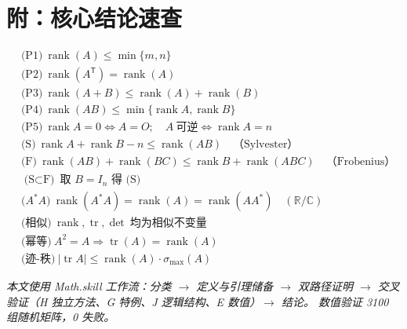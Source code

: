\documentclass[11pt]{ctexart}
\newcommand{\rank}{\operatorname{rank}}
\newcommand{\tr}{\operatorname{tr}}
\newcommand{\C}{\mathbb{C}}
\newcommand{\R}{\mathbb{R}}
\newcommand{\T}{^{\mathsf T}}
\begin{document}
\section*{附：核心结论速查}

\begin{keybox}
\begin{align*}
&\text{(P1)}\ \rank(A)\le\min\{m,n\}\\
&\text{(P2)}\ \rank(A\T)=\rank(A)\\
&\text{(P3)}\ \rank(A+B)\le\rank(A)+\rank(B)\\
&\text{(P4)}\ \rank(AB)\le\min\{\rank A,\rank B\}\\
&\text{(P5)}\ \rank A=0\iff A=O;\quad A\ \text{可逆}\iff\rank A=n\\
&\text{(S)}\ \rank A+\rank B-n\le\rank(AB)\quad\text{（Sylvester）}\\
&\text{(F)}\ \rank(AB)+\rank(BC)\le\rank B+\rank(ABC)\quad\text{（Frobenius）}\\
&\text{(S$\subset$F)}\ \text{取 }B=I_n\text{ 得 (S)}\\
&\text{($A^{*}A$)}\ \rank(A^{*}A)=\rank(A)=\rank(AA^{*})\quad(\R/\C)\\
&\text{(相似)}\ \rank,\tr,\det\ \text{均为相似不变量}\\
&\text{(幂等)}\ A^2=A\Rightarrow\tr(A)=\rank(A)\\
&\text{(迹-秩)}\ \lvert\tr A\rvert\le\rank(A)\cdot\sigma_{\max}(A)
\end{align*}
\end{keybox}

\vspace{0.4cm}
{\small\textit{本文使用 Math.skill 工作流：分类 $\to$ 定义与引理储备 $\to$ 双路径证明 $\to$
交叉验证（H 独立方法、G 特例、J 逻辑结构、E 数值）$\to$ 结论。
数值验证 3100 组随机矩阵，0 失败。}}
\end{document}
